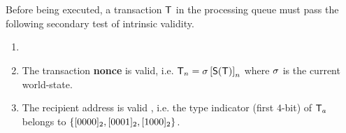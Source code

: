 Before being executed, a transaction $\textsf{T}$ in the processing queue must pass the following secondary test of intrinsic validity. 
\begin{enumerate}[nosep]
	\item {}
	
	\item The transaction \textbf{nonce} is valid,
   i.e. $\textsf{T}_n = \mathbf{\sigma}\left[\mathsf{S}{\left({\textsf{T}} \right)}\right]_n$ where $\mathbf{\sigma}$ is the current world-state.

   \item The recipient address is valid , i.e. the type indicator (first $4$-bit) of $\textsf{T}_a$ belongs to ${\left \{{[0000]_2,[0001]_2,[1000]_2} \right \}}$.
\end{enumerate}



	




